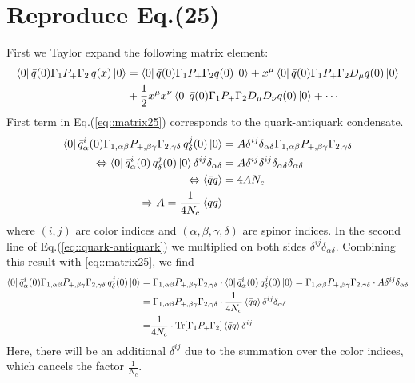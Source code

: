 \documentclass[openright,twoside,12pt,a4paper,final]{article}
\begin{document}
\section{Reproduce Eq.(25)}
	First we Taylor expand the following matrix element:
	\begin{align}
	    \bra{0} \bar{q}(0) \Gamma_{1} P_{+} \Gamma_{2} \,q(x) \ket{0} &= \bra{0} \bar{q}(0) \Gamma_{1} P_{+} \Gamma_{2} q(0) \ket{0} + x^{\mu} \bra{0} \bar{q}(0) \Gamma_{1} P_{+} \Gamma_{2} D_{\mu} q(0) \ket{0} \nonumber \\
	    & +\frac{1}{2} x^{\mu} x^{\nu} \bra{0} \bar{q}(0) \Gamma_{1} P_{+} \Gamma_{2} D_{\mu} D_{\nu} q(0) \ket{0} + \cdots
	    \label{eq::matrix25}
	\end{align}
    First term in Eq.(\ref{eq::matrix25}) corresponds to the quark-antiquark condensate. 
    \begin{align}
         \bra{0} \bar{q}^{i}_{\alpha}(0) \Gamma_{1,\alpha \beta} P_{+, \beta\gamma} \Gamma_{2, \gamma \delta} \,q^{j}_{\delta}(0) \ket{0} &= A \delta^{ij} \delta_{\alpha \delta} \Gamma_{1,\alpha \beta} P_{+, \beta\gamma} \Gamma_{2, \gamma \delta} \nonumber \\
         \Leftrightarrow \bra{0} \bar{q}^{i}_{\alpha}(0) \,q^{j}_{\delta}(0) \ket{0} \delta^{ij} \delta_{\alpha \delta} &= A \delta^{ij} \delta^{ij} \delta_{\alpha \delta} \delta_{\alpha \delta}\nonumber \\
          \Leftrightarrow \braket{\bar{q} q}   &= 4 A N_{c} \nonumber \\
          \Rightarrow A = \frac{1}{4  N_c} \braket{\bar{q} q}
         \label{eq::quark-antiquark}
    \end{align}
    where $(i,j)$ are color indices and $(\alpha, \beta,\gamma,\delta)$ are spinor indices. In the second line of Eq.(\ref{eq::quark-antiquark}) we multiplied on both sides $\delta^{ij} \delta_{\alpha \delta}$. Combining this result with \eqref{eq::matrix25}, we find
    \begin{align}
	    \bra{0} \bar{q}^{i}_{\alpha}(0) \Gamma_{1,\alpha \beta} P_{+, \beta\gamma} \Gamma_{2, \gamma \delta} \,q^{j}_{\delta}(0) \ket{0} =& \; \Gamma_{1,\alpha \beta} P_{+, \beta\gamma} \Gamma_{2, \gamma \delta} \cdot \bra{0} \bar{q}^{i}_{\alpha}(0) \,q^{j}_{\delta}(0) \ket{0} = \Gamma_{1,\alpha \beta} P_{+, \beta\gamma} \Gamma_{2, \gamma \delta} \cdot A \delta^{ij} \delta_{\alpha \delta} \nonumber \\ =& \; \Gamma_{1,\alpha \beta} P_{+, \beta\gamma} \Gamma_{2, \gamma \delta} \cdot \frac{1}{4  N_c} \braket{\bar{q} q} \delta^{ij} \delta_{\alpha \delta} \nonumber \\ =& \frac{1}{4  N_c} \cdot \text{Tr}[\Gamma_{1} P_{+} \Gamma_{2}] \braket{\bar{q} q} \delta^{ij}
    \end{align}
    Here, there will be an additional $\delta^{ij}$ due to the summation over the color indices, which cancels the factor $\frac{1}{N_c}$. 
    
\end{document}
